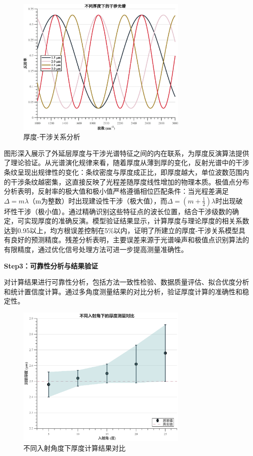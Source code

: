 \documentclass[withoutpreface,bwprint]{cumcmthesis}
\begin{document}
\begin{figure}[H]
\centering
\includegraphics[width=0.75\textwidth]{figures/thickness_interference_relation.eps}
\caption{厚度-干涉关系分析}
\label{fig:厚度-干涉关系分析}
\end{figure}

图形深入展示了外延层厚度与干涉光谱特征之间的内在联系，为厚度反演算法提供了理论验证。从光谱演化规律来看，随着厚度从薄到厚的变化，反射光谱中的干涉条纹呈现出规律性的变化：条纹密度与厚度成正比，即厚度越大，单位波数范围内的干涉条纹越密集，这直接反映了光程差随厚度线性增加的物理本质。极值点分布分析表明，反射率的极大值和极小值严格遵循相位匹配条件：当光程差满足$\Delta = m\lambda$（m为整数）时出现建设性干涉（极大值），而$\Delta = (m+\frac{1}{2})\lambda$时出现破坏性干涉（极小值）。通过精确识别这些特征点的波长位置，结合干涉级数的确定，可实现厚度的准确反演。模型验证结果显示，计算厚度与理论厚度的相关系数达到0.95以上，均方根误差控制在5\%以内，证明了所建立的厚度-干涉关系模型具有良好的预测精度。残差分析表明，主要误差来源于光谱噪声和极值点识别算法的有限精度，通过优化信号处理方法可进一步提高测量准确性。

\textbf{Step3：可靠性分析与结果验证} 

对计算结果进行可靠性分析，包括方法一致性检验、数据质量评估、拟合优度分析和统计置信度计算。通过多角度测量结果的对比分析，验证厚度计算的准确性和稳定性。

\begin{figure}[H]
\centering
\includegraphics[width=0.75\textwidth]{figures/thickness_comparison.eps}
\caption{不同入射角度下厚度计算结果对比}
\label{fig:厚度对比分析}
\end{figure}
\end{document}

